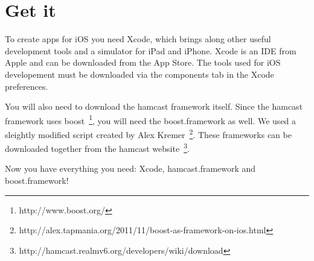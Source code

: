 \section{Get it}
\label{sec:get}

To create apps for iOS you need Xcode, which brings along other useful development tools and a simulator for iPad and iPhone. Xcode is an IDE from Apple and can be downloaded from the App Store. The tools used for iOS developement must be downloaded via the components tab in the Xcode preferences.

You will also need to download the hamcast framework itself. Since the hamcast framework uses boost~\footnote{http://www.boost.org/}, you will need the boost.framework as well. We used a sleightly modified script created by Alex Kremer~\footnote{http://alex.tapmania.org/2011/11/boost-as-framework-on-ios.html}. These frameworks can be downloaded together from the hamcast website~\footnote{http://hamcast.realmv6.org/developers/wiki/download}.

Now you have everything you need: Xcode, hamcast.framework and boost.framework!